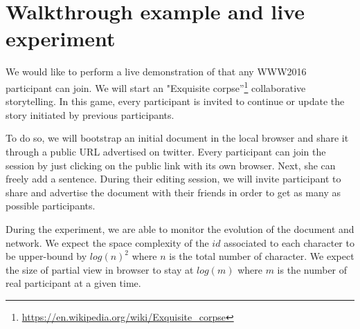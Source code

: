 
\section{Walkthrough example and live experiment}
\label{sec:live}


We would like to perform a live demonstration of \CRATE that any
WWW2016 participant can join. We will start an "Exquisite
corpse''\footnote{\url{https://en.wikipedia.org/wiki/Exquisite_corpse}}
collaborative storytelling. In this game, every participant is invited
to continue or update the story initiated by previous participants.

To do so, we will bootstrap an initial document in the local browser
and share it through a public URL advertised on twitter. Every
participant can join the session by just clicking on the public link
with its own browser. Next, she can freely add a sentence. During
their editing session, we will invite participant to share and
advertise the document with their friends in order to get as many as
possible participants.

During the experiment, we are able to monitor the evolution of the
document and network. We expect the space complexity of the $id$
associated to each character to be upper-bound by $log(n)^2$ where $n$
is the total number of character. We expect the size of partial view
in browser to stay at $log(m)$ where $m$ is the number of real
participant at a given time.
 

